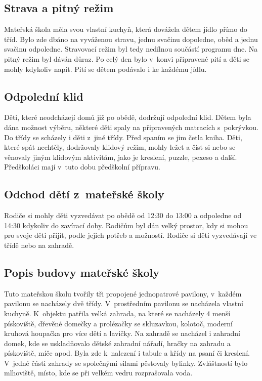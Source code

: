 		\subsection{Strava a pitný režim}
			Mateřská škola měla svou vlastní kuchyň, která dovážela dětem jídlo přímo do tříd. Bylo zde dbáno na vyváženou stravu, jednu svačinu dopoledne, oběd a jednu svačinu odpoledne. Stravovací režim byl tedy nedílnou součástí programu dne. Na pitný režim byl dáván důraz. Po celý den bylo v~konvi připravené pití a děti se mohly kdykoliv napít. Pití se dětem podávalo i ke každému jídlu.

		\subsection{Odpolední klid}
			Děti, které neodcházejí domů již po obědě, dodržují odpolední klid. Dětem byla dána možnost výběru, některé děti spaly na připravených matracích s~pokrývkou. Do třídy se scházely i děti z~jiné třídy. Před spaním se jim četla kniha. Děti, které spát nechtěly, dodržovaly klidový režim, mohly ležet a číst si nebo se věnovaly jiným klidovým aktivitám, jako je kreslení, puzzle, pexeso a další. Předškoláci mají v tuto dobu předškolní přípravu. 


		\subsection{Odchod dětí z~mateřské školy}
			Rodiče si mohly děti vyzvedávat po obědě od 12:30 do 13:00 a odpoledne od 14:30 kdykoliv do zavírací doby. Rodičům byl dán velký prostor, kdy si mohou pro svoje děti přijít, podle jejich potřeb a možností. Rodiče si děti vyzvedávají ve třídě nebo na zahradě. 

		\subsection{Popis budovy mateřské školy}

			Tuto mateřskou školu tvořily tři propojené jednopatrové pavilony, v~každém pavilonu se nacházely dvě třídy. V~prostředním pavilonu se nacházela vlastní kuchyně. K~objektu patřila velká zahrada, na které se nacházely 4 menší pískoviště, dřevěné domečky a prolézačky se skluzavkou, kolotoč, moderní kruhová houpačka pro více dětí a lavičky. Na zahradě se nacházel i zahradní domek, kde se uskladňovalo dětské zahradní nářadí, hračky na zahradu a pískoviště, míče apod. Byla zde k~nalezení i tabule a křídy na psaní či kreslení. V~jedné části zahrady se společnými silami pěstovaly bylinky. Zvláštností bylo mlhoviště, místo, kde se při velkém vedru rozprašovala voda. 

